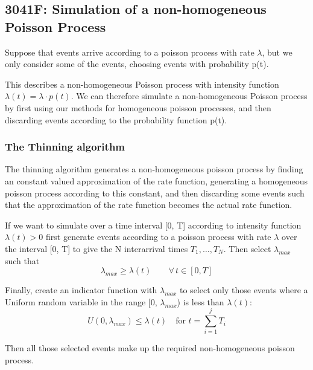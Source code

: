 \subsection{3041F: Simulation of a non-homogeneous Poisson Process}
Suppose that events arrive according to a poisson process with rate
\(\lambda\), but we only consider some of the events, choosing events with
probability p(t).\newline \newline

This describes a non-homogeneous Poisson process with intensity function
\(\lambda(t) = \lambda \cdot p(t)\).  We can therefore simulate a
non-homogeneous Poisson process by first using our methods for homogeneous
poisson processes, and then discarding events according to the probability
function p(t).  \newline \newline

\subsubsection{The Thinning algorithm}
The thinning algorithm generates a non-homogeneous poisson process by finding an constant valued 
approximation of the rate function, generating a homogeneous poisson process according to this 
constant, and then discarding some events such that the approximation of the rate function 
becomes the actual rate function.

If we want to simulate over a time interval [0, T] according to intensity function 
\(\lambda(t) > 0\) first generate events according to a poisson process with rate \(\lambda\)
over the interval [0, T] to give the N interarrival times \(T_1, \dots, T_N\).\newline
Then select \(\lambda_{max}\) such that 
\begin{equation*}
    \lambda_{max} \ge \lambda(t) \qquad \forall \, t \in [0, T]
\end{equation*}

Finally, create an indicator function with \(\lambda_{max}\) to select only those events where
a Uniform random variable in the range [0, \(\lambda_{max}\)) is less than \(\lambda(t)\): 
\begin{equation*}
    U(0, \lambda_{max}) \le \lambda(t) \quad \text{for } t = \sum_{i=1}^{j} T_i
\end{equation*}

    Then all those selected events make up the required non-homogeneous poisson process.
